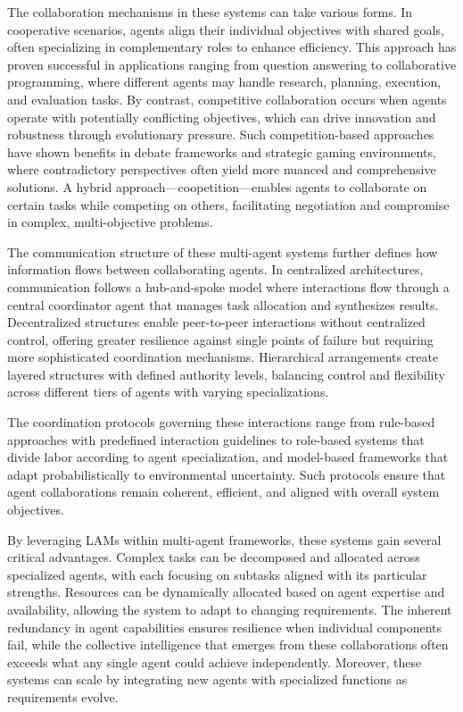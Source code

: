\documentclass[journal,twoside,10pt]{IEEEtran}
\begin{document}
The collaboration mechanisms in these systems can take various forms. In cooperative scenarios, agents align their individual objectives with shared goals, often specializing in complementary roles to enhance efficiency. This approach has proven successful in applications ranging from question answering to collaborative programming, where different agents may handle research, planning, execution, and evaluation tasks. By contrast, competitive collaboration occurs when agents operate with potentially conflicting objectives, which can drive innovation and robustness through evolutionary pressure. Such competition-based approaches have shown benefits in debate frameworks and strategic gaming environments, where contradictory perspectives often yield more nuanced and comprehensive solutions. A hybrid approach—coopetition—enables agents to collaborate on certain tasks while competing on others, facilitating negotiation and compromise in complex, multi-objective problems.

The communication structure of these multi-agent systems further defines how information flows between collaborating agents. In centralized architectures, communication follows a hub-and-spoke model where interactions flow through a central coordinator agent that manages task allocation and synthesizes results. Decentralized structures enable peer-to-peer interactions without centralized control, offering greater resilience against single points of failure but requiring more sophisticated coordination mechanisms. Hierarchical arrangements create layered structures with defined authority levels, balancing control and flexibility across different tiers of agents with varying specializations.

The coordination protocols governing these interactions range from rule-based approaches with predefined interaction guidelines to role-based systems that divide labor according to agent specialization, and model-based frameworks that adapt probabilistically to environmental uncertainty. Such protocols ensure that agent collaborations remain coherent, efficient, and aligned with overall system objectives.

By leveraging LAMs within multi-agent frameworks, these systems gain several critical advantages. Complex tasks can be decomposed and allocated across specialized agents, with each focusing on subtasks aligned with its particular strengths. Resources can be dynamically allocated based on agent expertise and availability, allowing the system to adapt to changing requirements. The inherent redundancy in agent capabilities ensures resilience when individual components fail, while the collective intelligence that emerges from these collaborations often exceeds what any single agent could achieve independently. Moreover, these systems can scale by integrating new agents with specialized functions as requirements evolve.
\end{document}
